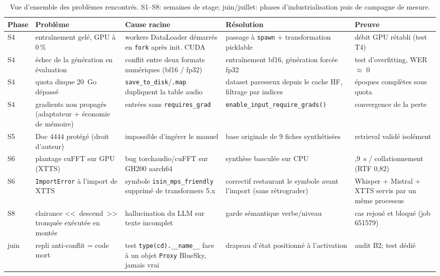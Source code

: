 \documentclass[11pt,a4paper]{article}
\begin{document}
\begin{table}[!htbp]
\centering
\caption[Vue d'ensemble des problèmes rencontrés]{Vue d'ensemble des problèmes rencontrés. S1--S8: semaines de stage; juin/juillet:
phases d'industrialisation puis de campagne de mesure.}
\label{tab:problemes}
\scriptsize
\begin{tabular}{>{\raggedright\arraybackslash}p{0.9cm} >{\raggedright\arraybackslash}p{3.3cm} >{\raggedright\arraybackslash}p{3.6cm} >{\raggedright\arraybackslash}p{3.6cm} >{\raggedright\arraybackslash}p{2.6cm}}
\toprule
\rowcolor{lightgray}\textbf{Phase} & \textbf{Problème} & \textbf{Cause racine} & \textbf{Résolution} & \textbf{Preuve}\\
\midrule
S4 & entraînement gelé, GPU à 0\,\% & workers DataLoader démarrés en \texttt{fork} après init. CUDA & passage à \texttt{spawn} + transformation picklable & débit GPU rétabli (test T4)\\
S4 & échec de la génération en évaluation & conflit entre deux formats numériques (bf16 / fp32) & entraînement bf16, génération forcée fp32 & test d'overfitting, WER $\approx$ 0\\
S4 & quota disque 20~Go dépassé & \texttt{save\_to\_disk}/\texttt{.map} dupliquent la table audio & dataset paresseux depuis le cache HF, filtrage par indices & 3 époques complètes sous quota\\
S4 & gradients non propagés (adaptateur + économie de mémoire) & entrées sans \texttt{requires\_grad} & \texttt{enable\_input\_}\allowbreak\texttt{require\_grads()} & convergence de la perte\\
S5 & Doc 4444 protégé (droit d'auteur) & impossible d'ingérer le manuel & base originale de 9 fiches synthétisées & retrieval validé isolément\\
S6 & plantage cuFFT sur GPU (XTTS) & bug torchaudio/cuFFT sur GH200 aarch64 & synthèse basculée sur CPU & 3,9~s / collationnement (RTF 0,82)\\
S6 & \texttt{ImportError} à l'import de XTTS & symbole \texttt{isin\_mps\_friendly} supprimé de transformers 5.x & correctif restaurant le symbole avant l'import (sans rétrograder) & Whisper + Mistral + XTTS servis par un même processus\\
S8 & clairance <<~descend~>> tronquée exécutée en montée & hallucination du LLM sur texte incomplet & garde sémantique verbe/niveau & cas rejoué et bloqué (job 651579)\\
juin & repli anti-conflit = code mort & test \texttt{type(cd).\_\_name\_\_} face à un objet \texttt{Proxy} BlueSky, jamais vrai & drapeau d'état positionné à l'activation & audit B2; test dédié\\

\end{tabular}
\end{table}
\end{document}
